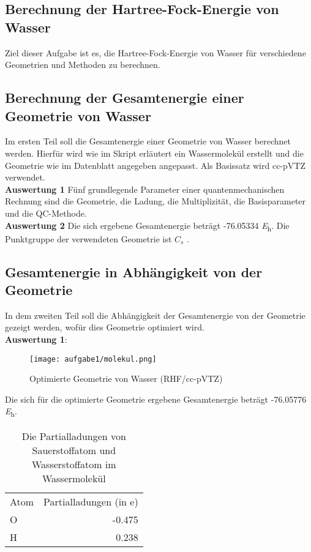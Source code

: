 \documentclass[12pt]{article}
\begin{document}
\tableofcontents  
\begin{onehalfspace}

\section{Berechnung der Hartree-Fock-Energie von Wasser}
Ziel dieser Aufgabe ist es, die Hartree-Fock-Energie von Wasser für verschiedene Geometrien und Methoden zu berechnen. 
\subsection{Berechnung der Gesamtenergie einer Geometrie von Wasser}
Im ersten Teil soll die Gesamtenergie einer Geometrie von Wasser berechnet werden. Hierfür wird wie im Skript erläutert ein Wassermolekül erstellt und die Geometrie wie im Datenblatt angegeben angepasst. Als Basissatz wird cc-pVTZ verwendet. \\
\textbf{Auswertung 1} Fünf grundlegende Parameter einer quantenmechanischen Rechnung sind die Geometrie, die Ladung, die Multiplizität, die Basisparameter und die QC-Methode. \\
\textbf{Auswertung 2} Die sich ergebene Gesamtenergie beträgt -76.05334 \si{\hartree}.
Die Punktgruppe der verwendeten Geometrie ist $C _s$ .\\
\subsection{Gesamtenergie in Abhängigkeit von der Geometrie}
In dem zweiten Teil soll die Abhängigkeit der Gesamtenergie von der Geometrie gezeigt werden, wofür dies Geometrie optimiert wird.\\
\textbf{Auswertung 1}:\\
\begin{figure}[!htbp]
\centering
  \texttt{[image: aufgabe1/molekul.png]}%
  \caption{Optimierte Geometrie von Wasser (RHF/cc-pVTZ)}
\end{figure}
\noindent
Die sich für die optimierte Geometrie ergebene Gesamtenergie beträgt -76.05776 \si{\hartree}. \\
\begin{table}[htbp]
\centering
\caption{Die Partialladungen von Sauerstoffatom und Wasserstoffatom im Wassermolekül}
\begin{tabular}{lr}
\toprule
Atom &  Partialladungen (in e)\\
O & -0.475\\
H & 0.238\\
\midrule
\bottomrule


\end{tabular}
\end{table}
\end{onehalfspace}
\end{document}
